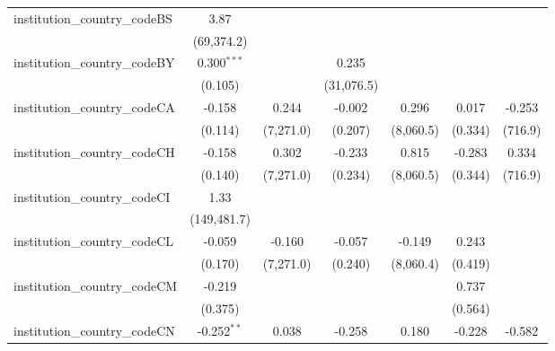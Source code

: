 \begin{tabular}{lcccccc}
   institution\_country\_codeBS          & 3.87           &               &                &                &                &   \\   
                                         & (69,374.2)     &               &                &                &                &   \\   
   institution\_country\_codeBY          & 0.300$^{***}$  &               & 0.235          &                &                &   \\   
                                         & (0.105)        &               & (31,076.5)     &                &                &   \\   
   institution\_country\_codeCA          & -0.158         & 0.244         & -0.002         & 0.296          & 0.017          & -0.253\\   
                                         & (0.114)        & (7,271.0)     & (0.207)        & (8,060.5)      & (0.334)        & (716.9)\\   
   institution\_country\_codeCH          & -0.158         & 0.302         & -0.233         & 0.815          & -0.283         & 0.334\\   
                                         & (0.140)        & (7,271.0)     & (0.234)        & (8,060.5)      & (0.344)        & (716.9)\\   
   institution\_country\_codeCI          & 1.33           &               &                &                &                &   \\   
                                         & (149,481.7)    &               &                &                &                &   \\   
   institution\_country\_codeCL          & -0.059         & -0.160        & -0.057         & -0.149         & 0.243          &   \\   
                                         & (0.170)        & (7,271.0)     & (0.240)        & (8,060.4)      & (0.419)        &   \\   
   institution\_country\_codeCM          & -0.219         &               &                &                & 0.737          &   \\   
                                         & (0.375)        &               &                &                & (0.564)        &   \\   
   institution\_country\_codeCN          & -0.252$^{**}$  & 0.038         & -0.258         & 0.180          & -0.228         & -0.582\\   

\end{tabular}
